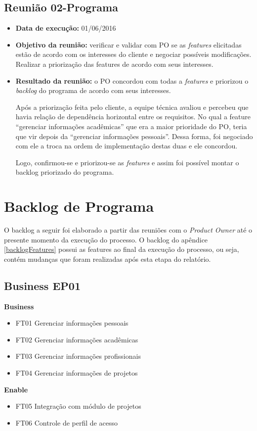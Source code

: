\subsection{Reunião 02-Programa}

\begin{itemize}
    \item \textbf{Data de execução:} 01/06/2016
    \item \textbf{Objetivo da reunião:} verificar e validar com PO se as \textit{features} elicitadas estão de acordo com os interesses do cliente e negociar possíveis modificações. Realizar a priorização das features de acordo com seus interesses.
    \item \textbf{Resultado da reunião:} o PO concordou com todas a \textit{features} e priorizou o \textit{backlog} do programa de acordo com seus interesses.

Após a priorização feita pelo cliente, a equipe técnica avaliou e percebeu que havia relação de dependência horizontal entre os requisitos. No qual a feature “gerenciar informações acadêmicas” que era a maior prioridade do PO, teria que vir depois da “gerenciar informações pessoais”. Dessa forma, foi negociado com ele a troca na ordem de implementação destas duas e ele concordou.

Logo, confirmou-se e priorizou-se as \textit{features} e assim foi possível montar o backlog priorizado do programa.
\end{itemize}
\section{Backlog de Programa}

O backlog a seguir foi elaborado a partir das reuniões com o \textit{Product Owner} até o presente momento da execução do processo. O backlog do apêndice \ref{backlogFeatures} possui as features ao final da execução do processo, ou seja, contém mudanças que foram realizadas após esta etapa do relatório.

\subsection{Business EP01}
\textbf{Business}
\begin{itemize}
    \item FT01 Gerenciar informações pessoais
    \item FT02 Gerenciar informações acadêmicas
    \item FT03 Gerenciar informações profissionais
    \item FT04 Gerenciar informações de projetos
\end{itemize}
\textbf{Enable}
\begin{itemize}
    \item FT05 Integração com módulo de projetos
    \item FT06 Controle de perfil de acesso
\end{itemize}
